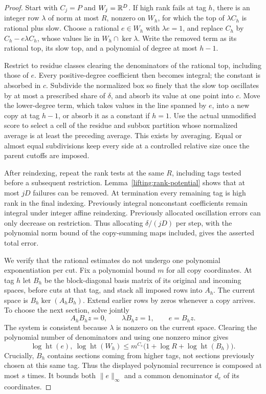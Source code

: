 \begin{proof}
Start with $C_j=P$ and $W_j=\mathbb R^D$.  If high rank fails at tag $h$,
there is an integer row $\lambda$ of norm at most $R$, nonzero on
$W_h$, for which the top of $\lambda C_h$ is rational plus slow.
Choose a rational $e\in W_h$ with $\lambda e=1$, and replace $C_h$
by $C_h-e\lambda C_h$, whose values lie in
$W_h\cap\ker\lambda$.  Write the removed term as its rational
top, its slow top, and a polynomial of degree at most $h-1$.

Restrict to residue classes clearing the denominators of the
rational top, including those of $e$.  Every positive-degree
coefficient then becomes integral; the constant is absorbed in $c$.
Subdivide the normalized box so finely that the slow top oscillates
by at most a prescribed share of $\delta$, and absorb its value at
one point into $c$.  Move the lower-degree term, which takes values
in the line spanned by $e$, into a new copy at tag $h-1$, or absorb
it as a constant if $h=1$.  Use the actual unmodified score to select
a cell of the residue and subbox partition whose normalized average
is at least the preceding average.  This exists by averaging.
Equal or almost equal subdivisions keep every side at a controlled
relative size once the parent cutoffs are imposed.

After reindexing, repeat the rank tests at the same $R$, including
tags tested before a subsequent restriction.  Lemma~\ref{lifting:rank-potential}
shows that at most $jD$ failures can be removed.  At termination every
remaining tag is high rank in the final indexing.  Previously
integral nonconstant coefficients remain integral under integer
affine reindexing.  Previously allocated oscillation errors can only
decrease on restriction.  Thus allocating $\delta/(jD)$ per step,
with the polynomial norm bound of the copy-summing maps included,
gives the asserted total error.

We verify that the rational estimates do not undergo one polynomial
exponentiation per cut.  Fix a polynomial bound $m$ for all copy
coordinates.  At tag $h$ let $B_h$ be the block-diagonal basis matrix
of its original and incoming spaces, before cuts at that tag, and
stack all imposed rows into $A_h$.  The current space is
$B_h\ker(A_hB_h)$.  Extend earlier rows by zeros whenever a copy
arrives.  To choose the next section, solve jointly
\[
 A_hB_hz=0,\qquad \lambda B_hz=1,
 \qquad e=B_hz.
\]
The system is consistent because $\lambda$ is nonzero on the
current space.  Clearing the polynomial number of denominators and
using one nonzero minor gives
\[
 \log\operatorname{ht}(e),\ \log\operatorname{ht}(W_h)
 \le m^{C_s}\bigl(1+\log R+\log\operatorname{ht}(B_h)\bigr).
\]
Crucially, $B_h$ contains sections coming from higher tags, not
sections previously chosen at this same tag.  Thus the displayed
polynomial recurrence is composed at most $s$ times.  It bounds both
$\|e\|_\infty$ and a common denominator $d_e$ of its coordinates.


\end{proof}
